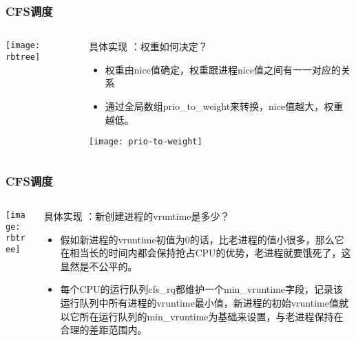 \begin{frame}
	\frametitle{CFS调度}
	\begin{columns}
		\begin{column}{.4\textwidth}
			\Large \centering
			
			\texttt{[image: rbtree]}

		\end{column}
		
		\begin{column}{.6\textwidth}

			具体实现 ：权重如何决定？
			\begin{itemize}
				\item 权重由nice值确定，权重跟进程nice值之间有一一对应的关系
				\item 通过全局数组prio\_to\_weight来转换，nice值越大，权重越低。

			\end{itemize}
						\texttt{[image: prio-to-weight]}
		\end{column}
	\end{columns}
\end{frame}




\begin{frame}
	\frametitle{CFS调度}
	\begin{columns}
		\begin{column}{.4\textwidth}
			\Large \centering
			
			\texttt{[image: rbtree]}
			
		\end{column}
		
		\begin{column}{.6\textwidth}
			
			具体实现 ：新创建进程的vruntime是多少？
			\begin{itemize}
				\item 假如新进程的vruntime初值为0的话，比老进程的值小很多，那么它在相当长的时间内都会保持抢占CPU的优势，老进程就要饿死了，这显然是不公平的。
				\item 每个CPU的运行队列cfs\_rq都维护一个min\_vruntime字段，记录该运行队列中所有进程的vruntime最小值，新进程的初始vruntime值就以它所在运行队列的min\_vruntime为基础来设置，与老进程保持在合理的差距范围内。
			\end{itemize}
		\end{column}
	\end{columns}
\end{frame}


